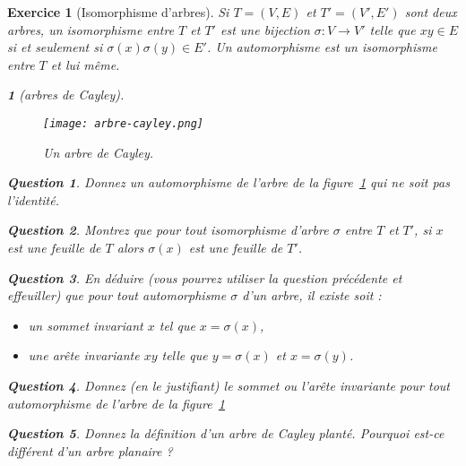 \documentclass{article}
\theoremstyle{exostyle}
\newtheorem{exo}{Exercice}
\theoremstyle{partiestyle}
\newtheorem{partie}{}[exo]
\theoremstyle{questionstyle}
\newtheorem{questionpartie}{Question}[partie]
\begin{document}
\begin{exo}[Isomorphisme d'arbres]
	Si $T=(V, E)$ et $T'=(V', E')$ sont deux arbres, un isomorphisme entre $T$ et $T'$ est une bijection $\sigma : V \rightarrow V'$ telle que $xy \in E$ si et seulement si $\sigma(x)\sigma(y) \in E'$. Un automorphisme est un isomorphisme entre $T$ et lui même.
	\begin{partie}[arbres de Cayley]
	~\\

	\begin{figure}[h!]
		\vspace{1cm}
		\begin{center}
			\texttt{[image: arbre-cayley.png]}
		\end{center}
		\caption{Un arbre de Cayley.\label{fig-cayley}}
	\end{figure}
	\begin{questionpartie}
		Donnez un automorphisme de l'arbre de la figure~\ref{fig-cayley} qui ne soit pas l'identité.\label{auto-cayley}
	\end{questionpartie}

	\begin{questionpartie}
		Montrez que pour tout isomorphisme d'arbre $\sigma$ entre $T$ et $T'$, si $x$ est une feuille de $T$ alors $\sigma(x)$ est une feuille de $T'$.
	\end{questionpartie}
	\begin{questionpartie}
		En déduire (vous pourrez utiliser la question précédente et effeuiller) que pour tout automorphisme $\sigma$ d'un arbre, il existe soit :
			\begin{itemize}
				\item un sommet invariant $x$ tel que $x = \sigma(x)$,
				\item une arête invariante $xy$ telle que $y = \sigma(x)$ et $x = \sigma(y)$.
			\end{itemize}
	\end{questionpartie}
	\begin{questionpartie}
		Donnez (en le justifiant) le sommet ou l'arête invariante pour tout automorphisme de l'arbre de la figure~\ref{fig-cayley}
	\end{questionpartie}
	\begin{questionpartie}
		Donnez la définition d'un arbre de Cayley planté. Pourquoi est-ce différent d'un arbre planaire ?
	\end{questionpartie}

\end{partie}


\end{exo}
\end{document}
